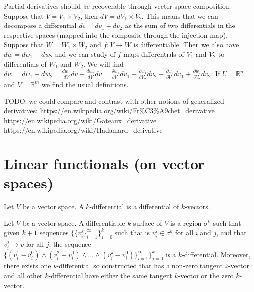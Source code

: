 \documentclass[11pt,letterpaper,fleqn]{memoir}
\begin{document}
\begin{remark}
	Partial derivatives should be recoverable through vector space composition. Suppose that $V = V_1 \times V_2$, then $dV = dV_1 \times V_2$. This means that we can decompose a differential $dv= dv_1 + dv_2$ as the sum of two differentials in the respective spaces (mapped into the composite through the injection map). Suppose that $W = W_1 \times W_2$ and $f : V \to W$ is differentiable. Then we also have $dw= dw_1 + dw_2$ and we can study of $f$ maps differentials of $V_1$ and $V_2$ to differentials of $W_1$ and $W_2$. We will find $dw = dw_1 + dw_2 = \frac{dw_1}{dV} dv + \frac{dw_2}{dV} dv = \frac{\partial w_1}{\partial V_1} dv_1 + \frac{\partial w_1}{\partial V_2} dv_2 + \frac{\partial w_2}{\partial V_1} dv_1 + \frac{\partial w_2}{\partial V_2} dv_2$. If $U = \mathbb{R}^n$ and $V = \mathbb{R}^m$ we find the usual definitions.
\end{remark}

\begin{remark}
	TODO: we could compare and contrast with other notions of generalized derivatives: \url{https://en.wikipedia.org/wiki/Fr%C3%A9chet_derivative} \url{https://en.wikipedia.org/wiki/Gateaux_derivative} \url{https://en.wikipedia.org/wiki/Hadamard_derivative}
\end{remark}

\section{Linear functionals (on vector spaces)}

\begin{defn}
	Let $V$ be a vector space. A $k$-differential is a differential of  $k$-vectors.
\end{defn}

\begin{defn}
	Let $V$ be a vector space. A differentiable $k$-surface of $V$ is a region $\sigma^k$ such that given $k+1$ sequences $\{ \{ {v}^j_i \}_{i=1}^{\infty}\}_{j=0}^{k}$ such that is ${v}^j_i \in \sigma^k$ for all $i$ and $j$, and that ${v}^j_i \to v$ for all $j$, the sequence $\{ ({v}^1_i - {v}^0_i) \wedge ({v}^2_i - {v}^0_i) \wedge ... \wedge ({v}^k_i - {v}^0_i) \}_{i=1}^{\infty}\}_{j=0}^{k}$ is a $k$-differential. Moreover, there exists one $k$-differential so constructed that has a non-zero tangent $k$-vector and all other $k$-differential have either the same tangent $k$-vector or the zero $k$-vector.
\end{defn}
\end{document}
